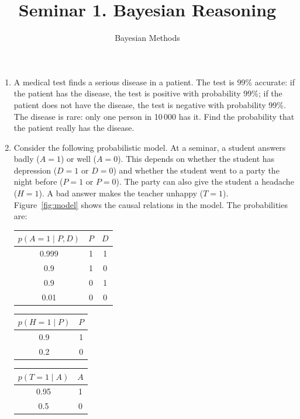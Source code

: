 \documentclass[11pt]{article}
\title{Seminar 1. Bayesian Reasoning}
\author{Bayesian Methods}
\date{}
\begin{document}
\maketitle
\vspace{-2em}

\begin{enumerate}[label=\arabic*.]

\item A medical test finds a serious disease in a patient. The test is
  99\% accurate: if the patient has the disease, the test is positive with
  probability 99\%; if the patient does not have the disease, the test is
  negative with probability 99\%. The disease is rare: only one person in
  10\,000 has it. Find the probability that the patient really has the
  disease.

\item Consider the following probabilistic model. At a seminar, a student
  answers badly ($A = 1$) or well ($A = 0$). This depends on whether the
  student has depression ($D = 1$ or $D = 0$) and whether the student went
  to a party the night before ($P = 1$ or $P = 0$). The party can also give
  the student a headache ($H = 1$). A bad answer makes the teacher unhappy
  ($T = 1$). Figure~\ref{fig:model} shows the causal relations in the model.
  The probabilities are:
  \begin{center}
    \begin{tabular}[t]{c|cc}
      \toprule
      $p(A = 1 \mid P, D)$ & $P$ & $D$ \\
      \midrule
      0.999 & 1 & 1 \\
      0.9   & 1 & 0 \\
      0.9   & 0 & 1 \\
      0.01  & 0 & 0 \\
      \bottomrule
    \end{tabular}
    \quad
    \begin{tabular}[t]{c|c}
      \toprule
      $p(H = 1 \mid P)$ & $P$ \\
      \midrule
      0.9 & 1 \\
      0.2 & 0 \\
      \bottomrule
    \end{tabular}
    \quad
    \begin{tabular}[t]{c|c}
      \toprule
      $p(T = 1 \mid A)$ & $A$ \\
      \midrule
      0.95 & 1 \\
      0.5  & 0 \\
      \bottomrule
    \end{tabular}


\end{center}
\end{enumerate}
\end{document}
